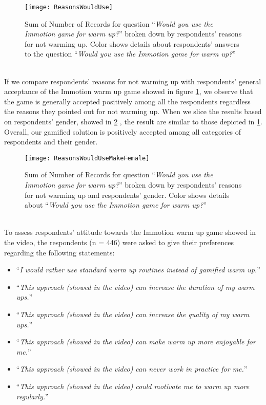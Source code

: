 \begin{figure}[h]
    \centering
    \texttt{[image: ReasonsWouldUse]}
    \caption{Sum of Number of Records for question ``\textit{Would you use the Immotion game for warm up?}'' broken down by respondents' reasons for not warming up. Color shows details about respondents' answers to the question ``\textit{Would you use the Immotion game for warm up?}''}
    \label{fig:ReasonsWouldUse}
\end{figure}\\
If we compare respondents' reasons for not warming up with respondents' general acceptance of the Immotion warm up game showed in figure \ref{fig:ReasonsWouldUse}, we observe that the game is generally accepted positively among all the respondents regardless the reasons they pointed out for not warming up. When we slice the results based on respondents' gender, showed in \ref{fig:ReasonsWouldUseMakeFemale} , the result are similar to those depicted in \ref{fig:ReasonsWouldUse}. Overall, our gamified solution is positively accepted among all categories of respondents and their gender.\\ 
\begin{figure}[h]
    \centering
    \texttt{[image: ReasonsWouldUseMakeFemale]}
    \caption{Sum of Number of Records for question ``\textit{Would you use the Immotion game for warm up?}'' broken down by respondents' reasons for not warming up and respondents' gender. Color shows details about ``\textit{Would you use the Immotion game for warm up?}''}
    \label{fig:ReasonsWouldUseMakeFemale}
\end{figure}\\
To assess respondents' attitude towards the Immotion warm up game showed in the video, the respondents (n = 446) were asked to give their preferences regarding the following statements:
\begin{itemize}
\item ``\textit{I would rather use standard warm up routines instead of gamified warm up.}''
\item ``\textit{This approach (showed in the video) can increase the duration of my warm ups.}''
\item ``\textit{This approach (showed in the video) can increase the quality of my warm ups.}''
\item ``\textit{This approach (showed in the video) can make warm up more enjoyable for me.}''
\item ``\textit{This approach (showed in the video) can never work in practice for me.}''
\item ``\textit{This approach (showed in the video) could motivate me to warm up more regularly.}''
\end{itemize}
